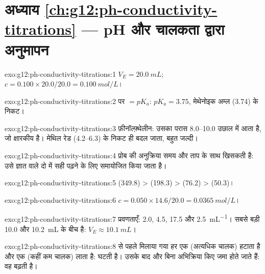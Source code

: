 \section*{अध्याय \ref{ch:g12:ph-conductivity-titrations} --- pH और चालकता द्वारा अनुमापन}

\begin{solution}{exo:g12:ph-conductivity-titrations:1}
$V_E = \qty{20.0}{mL}$; $c = 0.100 \times 20.0 / 20.0 = \qty{0.100}{mol/L}$।
\end{solution}

\begin{solution}{exo:g12:ph-conductivity-titrations:2}
 पर  $= pK_a$: $pK_a = 3.75$, मेथेनोइक अम्ल
(3.74) के निकट।
\end{solution}

\begin{solution}{exo:g12:ph-conductivity-titrations:3}
फ़ीनॉल्फ़्थेलीन: उसका परास 8.0--10.0 उछाल में आता है, जो क्षारकीय है।
मेथिल रेड (4.2--6.3)  के निकट ही बदल जाता, बहुत जल्दी।
\end{solution}

\begin{solution}{exo:g12:ph-conductivity-titrations:4}
प्रोब की अनुक्रिया समय और ताप के साथ खिसकती है: उसे ज्ञात  वाले
दो  में सही पढ़ने के लिए समायोजित किया जाता है।
\end{solution}

\begin{solution}{exo:g12:ph-conductivity-titrations:5}
 (349.8) >  (198.3) >  (76.2) >  (50.3)।
\end{solution}

\begin{solution}{exo:g12:ph-conductivity-titrations:6}
$c = 0.050 \times 14.6 / 20.0 = \qty{0.0365}{mol/L}$।
\end{solution}

\begin{solution}{exo:g12:ph-conductivity-titrations:7}
प्रवणताएँ: 2.0, 4.5, 17.5 और \qty{2.5}{mL^{-1}}। सबसे बड़ी
10.0 और \qty{10.2}{mL} के बीच है: $V_E \approx \qty{10.1}{mL}$।
\end{solution}

\begin{solution}{exo:g12:ph-conductivity-titrations:8}
 से पहले मिलाया गया हर  एक  (अत्यधिक
चालक) हटाता है और एक  (कहीं कम चालक) लाता है:
 घटती है। उसके बाद  और  बिना अभिक्रिया किए
जमा होते जाते हैं: वह बढ़ती है।
\end{solution}

